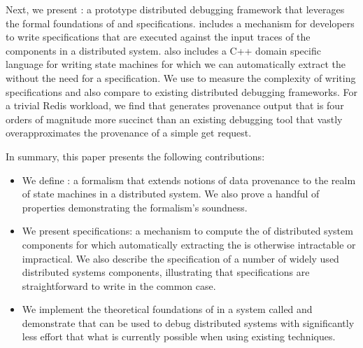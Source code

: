 Next, we present \fluent{}: a prototype distributed debugging framework that
leverages the formal foundations of \watprovenance{} and \watprovenance{}
specifications. \fluent{} includes a mechanism for developers to write
\watprovenance{} specifications that are executed against the input traces of
the components in a distributed system. \fluent{} also includes a C++ domain
specific language for writing state machines for which we can automatically
extract the \watprovenance{} without the need for a \watprovenance{}
specification. We use \fluent{} to measure the complexity of writing
\watprovenance{} specifications and also compare \fluent{} to existing
distributed debugging frameworks. For a trivial Redis workload, we find that
\fluent{} generates provenance output that is four orders of magnitude more
succinct than an existing 
debugging tool that vastly overapproximates the
provenance of a simple get request.

In summary, this paper presents the following contributions:
\begin{itemize}
  \item
    We define \watprovenance{}: a formalism that extends notions of data
    provenance to the realm of state machines in a distributed system. We also
    prove a handful of properties demonstrating the formalism's soundness.
  \item
    We present \watprovenance{} specifications: a mechanism to compute the
    \watprovenance{} of distributed system components for which automatically
    extracting the \watprovenance{} is otherwise intractable or impractical. We
    also describe the \watprovenance{} specification of a number of widely used
    distributed systems components, illustrating that \watprovenance{}
    specifications are straightforward to write in the common case.
  \item
    We implement the theoretical foundations of \watprovenance{} in a system
    called \fluent{} and demonstrate that \fluent{} can be used to debug
    distributed systems with significantly less effort that what is currently
    possible when using existing techniques.
\end{itemize}

